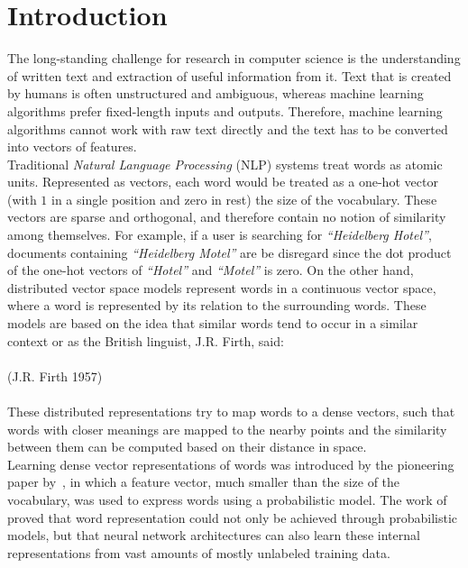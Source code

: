 \chapter{Introduction}\label{chap:intro}
The long-standing challenge for research in computer science is the understanding of written text and extraction of useful information from it. Text that is created by humans is often unstructured and ambiguous, whereas machine learning algorithms  prefer  fixed-length inputs and outputs. Therefore, machine learning algorithms cannot work with raw text directly and the text has to be converted into vectors of features.
\\
\noindent
Traditional \emph{Natural Language Processing} (NLP) systems treat words as atomic units. Represented as vectors, each word would be treated as a one-hot vector (with $1$ in a single position and zero in rest) the size of the vocabulary. These vectors are sparse and orthogonal, and therefore contain no notion of similarity among themselves. For example, if a user is searching for \emph{``Heidelberg Hotel''}, documents containing \emph{``Heidelberg Motel''} are  be disregard since the dot product of the one-hot vectors of \emph{``Hotel''} and \emph{``Motel''} is zero. On the other hand, distributed vector space models represent words in a continuous vector space, where a word is represented by its relation to the surrounding words. These models are based on the idea that similar words tend to occur in a similar context or as the British linguist, J.R. Firth, said:
\\
\\
\noindent
{} (J.R. Firth 1957)\\
\\
\noindent
These distributed representations try to map words to a dense vectors, such that words with closer meanings are mapped to the nearby points and the similarity between them can be computed based on their distance in space.
\\
\noindent 
Learning dense vector representations of words was introduced by the pioneering paper by~, in which a feature vector, much smaller than the size of the vocabulary, was used to express words using a probabilistic model. The work of~ proved that word representation could not only be achieved through probabilistic models, but that neural network architectures can also learn these internal representations from vast amounts of mostly unlabeled training data.\\
